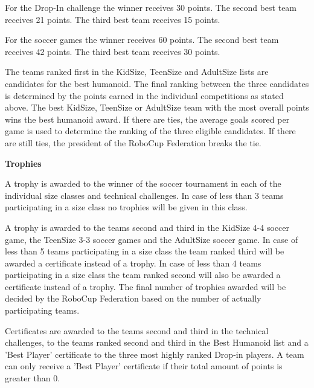 For the Drop-In challenge the winner receives 30 points. The second best team receives 21 points. The third best team receives 15 points.


\bigskip

For the soccer games the winner receives 60 points. The second best team receives 42 points. The third best team receives 30 points.

\bigskip

The teams ranked first in the KidSize, TeenSize and AdultSize lists are candidates for the best humanoid. The final ranking between the three candidates is determined by the points earned in the individual competitions as stated above. The best KidSize, TeenSize or AdultSize team with the most overall points wins the best humanoid award. If there are ties, the average goals scored per game is used to determine the ranking of the three eligible candidates. If there are still ties, the president of the RoboCup Federation breaks the tie.

\bigskip

{\bfseries Trophies}

\headlinebox

A trophy is awarded to the winner of the soccer tournament in each of the individual size classes and technical challenges. In case of less than 3 teams participating in a size class no trophies will be given in this class.

\bigskip

A trophy is awarded to the teams second and third in the KidSize 4-4 soccer game, the TeenSize 3-3 soccer games and the AdultSize   soccer game. In case of less than 5 teams participating in a size class the team ranked third will be awarded a certificate instead of a trophy. In case of less than 4 teams participating in a size class the team ranked second will also be awarded a certificate instead of a trophy. The final number of trophies awarded will be decided by the RoboCup Federation based on the number of actually participating teams.

\bigskip

Certificates are awarded to the teams second and third in the technical challenges, to the teams ranked second and third in the Best Humanoid list and a 'Best Player' certificate to the three most highly ranked Drop-in players. A team can only receive a 'Best Player' certificate if their total amount of points is greater than 0.

\bigskip

